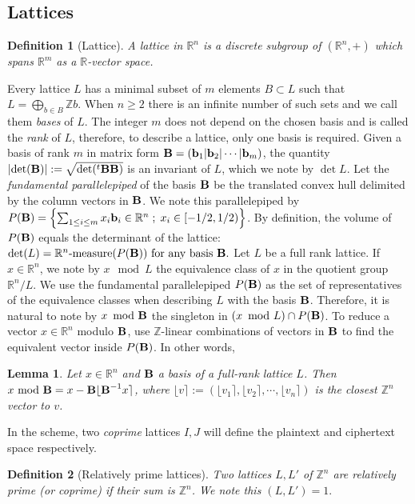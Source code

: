 \documentclass[11pt]{article}
\theoremstyle{plain}
\newtheorem{LEM}[THE]{Lemma}
\newtheorem{DEF}{Definition}[section]
\theoremstyle{definition}
\theoremstyle{remark}
\newcommand{\RR}{\mathbb{R}}      %
\newcommand{\ZZ}{\mathbb{Z}}      %
\newcommand{\BB}{{\mbox{\bf B}}}
\newcommand{\bb}{{\mbox{\bf b}}}
\begin{document}
\subsection{Lattices}
\label{subsec:lattices}
\begin{DEF}[Lattice]\label{def:lattice}
	A lattice in $\RR^n$ is a discrete subgroup of $(\RR^n,+)$ which spans $\RR^m$ as a $\RR$-vector space.	
\end{DEF}
Every lattice $L$ has a minimal subset of $m$ elements $B\subset L$ such that $L=\bigoplus_{b\in B}\ZZ b$. When $n\geq 2$ there is an infinite number of such sets and we call them {\it bases} of $L$. The integer $m$ does not depend on the chosen basis and is called the {\it rank} of $L$, therefore, to describe a lattice, only one basis is required. Given a basis of rank $m$ in matrix form $\BB=(\bb_1|\bb_2|\cdots|\bb_m)$, the quantity $|\!\det(\BB)|:=\sqrt{\det({}^t\BB\BB)}$ is an invariant of $L$, which we note by $\det L$. Let the {\it fundamental parallelepiped} of the basis $\BB$ be the translated convex hull delimited by the column vectors in $\BB$. We note this parallelepiped by $P(\BB)=\left\{\sum_{1\leq i\leq m} x_i\mathbf{b}_i\in\RR^n\; ;\; x_i\in [-1/2,1/2)\right\}$. By definition, the volume of $P(\BB)$ equals the determinant of the lattice:
$\det(L)=\RR^n\mbox{-measure}(P(\BB))\mbox{ for any basis }\BB.$
Let $L$ be a full rank lattice. If $x\in \RR^n$, we note by $x\!\!\mod L$ the equivalence class of $x$ in the quotient group $\RR^n/L$. We use the fundamental parallelepiped $P(\BB)$ as the set of representatives of the equivalence classes when describing $L$ with the basis $\BB$. Therefore, it is natural to note by $x\!\mod \BB$ the singleton in $(x\!\mod L)\cap P(\BB)$. To reduce a vector $x\in \RR^n$ modulo $\BB$, use $\ZZ$-linear combinations of vectors in $\BB$ to find the equivalent vector inside $P(\BB)$. In other words,
\begin{LEM}
Let $x\in \RR^n$ and $\BB$ a basis of a full-rank lattice $L$. Then $x\!\!\mod\BB=x-\BB\lfloor \BB^{-1} x\rceil$, where $\lfloor v \rceil:=(\lfloor v_1 \rceil,\lfloor v_2 \rceil,\cdots,\lfloor v_n \rceil)$ is the closest $\ZZ^n$ vector to $v$.
\end{LEM}
In the scheme, two {\it coprime} lattices $I,J$ will define the plaintext and ciphertext space respectively. 
\begin{DEF}[Relatively prime lattices]
Two lattices $L,L'$ of $\ZZ^n$ are relatively prime (or coprime) if their sum is $\ZZ^n$. We note this $(L,L')=1.$
\end{DEF}
\end{document}
